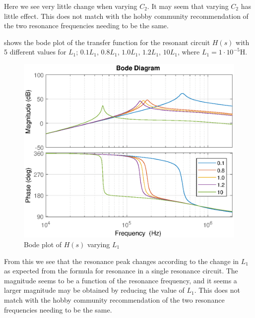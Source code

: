 Here we see very little change when varying $C_2$. It may seem that varying $C_2$ has little effect. This does not match with the hobby community recommendation of the two resonance frequencies needing to be the same.

\newpage
{} shows the bode plot of the transfer function for the resonant circuit $H(s)$ with 5 different values for $L_1$; $0.1 L_1$, $0.8 L_1$, $1.0 L_1$, $1.2 L_1$, $10 L_1$, where $L_1 = 1 \cdot 10^{-5}$H.

\begin{figure}[H]
    \centering
    \includegraphics[width=\textwidth]{img/CoilRigBode_L1.eps}
    \caption{Bode plot of $H(s)$ varying $L_1$}
    \label{fig:bode_l1}
\end{figure}

From this we see that the resonance peak changes according to the change in $L_1$ as expected from the formula for resonance in a single resonance circuit. The magnitude seems to be a function of the resonance frequency, and it seems a larger magnitude may be obtained by reducing the value of $L_1$. This does not match with the hobby community recommendation of the two resonance frequencies needing to be the same.

